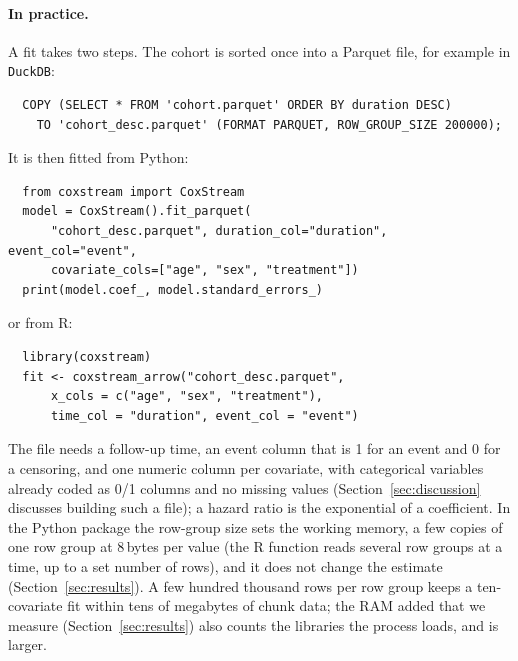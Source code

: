 \documentclass[11pt,a4paper]{article}
\begin{document}
\paragraph{In practice.} A fit takes two steps. The cohort is sorted once into
a Parquet file, for example in \texttt{DuckDB}:
\begin{verbatim}
  COPY (SELECT * FROM 'cohort.parquet' ORDER BY duration DESC)
    TO 'cohort_desc.parquet' (FORMAT PARQUET, ROW_GROUP_SIZE 200000);
\end{verbatim}
It is then fitted from Python:
\begin{verbatim}
  from coxstream import CoxStream
  model = CoxStream().fit_parquet(
      "cohort_desc.parquet", duration_col="duration", event_col="event",
      covariate_cols=["age", "sex", "treatment"])
  print(model.coef_, model.standard_errors_)
\end{verbatim}
or from R:
\begin{verbatim}
  library(coxstream)
  fit <- coxstream_arrow("cohort_desc.parquet",
      x_cols = c("age", "sex", "treatment"),
      time_col = "duration", event_col = "event")
\end{verbatim}
The file needs a follow-up time, an event column that is 1 for an event and 0
for a censoring, and one numeric column per covariate, with categorical
variables already coded as 0/1 columns and no missing values
(Section~\ref{sec:discussion} discusses building such a file); a hazard ratio
is the exponential of a coefficient. In the Python package the row-group size
sets the working memory, a few copies of one row group at 8\,bytes per value
(the R function reads several row groups at a time, up to a set number of
rows), and it does not change the estimate (Section~\ref{sec:results}). A few
hundred thousand rows per row group keeps a ten-covariate fit within tens of
megabytes of chunk data; the RAM added that we measure
(Section~\ref{sec:results}) also counts the libraries the process loads, and
is larger.
\end{document}
